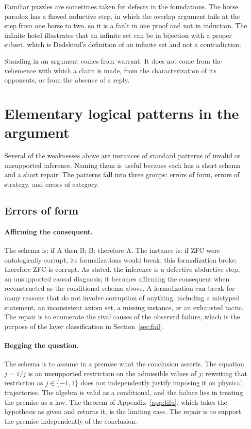 \documentclass[11pt]{article}
\begin{document}
Familiar puzzles are sometimes taken for defects in the foundations. The horse paradox has a flawed inductive step, in which the overlap argument fails at the step from one horse to two, so it is a fault in one proof and not in induction. The infinite hotel illustrates that an infinite set can be in bijection with a proper subset, which is Dedekind's definition of an infinite set and not a contradiction.

\medskip
Standing in an argument comes from warrant. It does not come from the vehemence with which a claim is made, from the characterization of its opponents, or from the absence of a reply.

\section{Elementary logical patterns in the argument}
\label{sec:patterns}

Several of the weaknesses above are instances of standard patterns of invalid or unsupported inference. Naming them is useful because each has a short schema and a short repair. The patterns fall into three groups: errors of form, errors of strategy, and errors of category.

\subsection{Errors of form}

\paragraph{Affirming the consequent.} The schema is: if A then B; B; therefore A. The instance is: if ZFC were ontologically corrupt, its formalizations would break; this formalization broke; therefore ZFC is corrupt. As stated, the inference is a defective abductive step, an unsupported causal diagnosis; it becomes affirming the consequent when reconstructed as the conditional schema above. A formalization can break for many reasons that do not involve corruption of anything, including a mistyped statement, an inconsistent axiom set, a missing instance, or an exhausted tactic. The repair is to enumerate the rival causes of the observed failure, which is the purpose of the layer classification in Section~\ref{sec:fail}.

\paragraph{Begging the question.} The schema is to assume in a premise what the conclusion asserts. The equation $j=1/j$ is an unsupported restriction on the admissible values of $j$; rewriting that restriction as $j\in\{-1,1\}$ does not independently justify imposing it on physical trajectories. The algebra is valid as a conditional, and the failure lies in treating the premise as a law. The theorem of Appendix~\ref{app:tifu}, which takes the hypothesis as given and returns it, is the limiting case. The repair is to support the premise independently of the conclusion.
\end{document}
